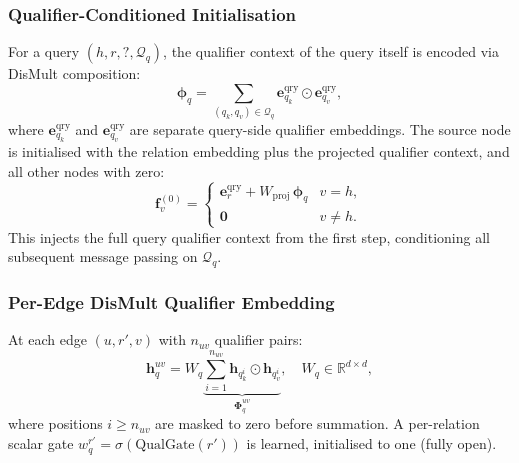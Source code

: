 \documentclass[10pt,journal,compsoc]{IEEEtran}
\begin{document}
\subsubsection{Qualifier-Conditioned Initialisation}
For a query $(h, r, ?, \mathcal{Q}_q)$,
the qualifier context of the query itself is encoded via
DisMult composition:
\begin{equation}
  \boldsymbol{\phi}_q
  = \sum_{(q_k, q_v) \in \mathcal{Q}_q}
    \mathbf{e}_{q_k}^{\mathrm{qry}}
    \odot
    \mathbf{e}_{q_v}^{\mathrm{qry}},
  \label{eq:hr_phi_query}
\end{equation}
where $\mathbf{e}_{q_k}^{\mathrm{qry}}$ and
$\mathbf{e}_{q_v}^{\mathrm{qry}}$ are separate query-side
qualifier embeddings.
The source node is initialised with the relation embedding
plus the projected qualifier context, and all other nodes
with zero:
\begin{equation}
  \mathbf{f}_v^{(0)} =
  \begin{cases}
    \mathbf{e}_r^{\mathrm{qry}}
    + W_{\mathrm{proj}}\,\boldsymbol{\phi}_q
    & v = h, \\
    \mathbf{0}
    & v \neq h.
  \end{cases}
  \label{eq:hr_init}
\end{equation}
This injects the full query qualifier context from the first
step, conditioning all subsequent message passing on
$\mathcal{Q}_q$.

\subsubsection{Per-Edge DisMult Qualifier Embedding}
At each edge $(u, r', v)$ with $n_{uv}$ qualifier pairs:
\begin{equation}
  \mathbf{h}_q^{uv}
  = W_q
    \underbrace{
      \sum_{i=1}^{n_{uv}}
      \mathbf{h}_{q_k^i} \odot \mathbf{h}_{q_v^i}
    }_{\boldsymbol{\Phi}_{q}^{uv}},
  \quad W_q \in \mathbb{R}^{d \times d},
  \label{eq:hr_hq}
\end{equation}
where positions $i \geq n_{uv}$ are masked to zero before
summation.
A per-relation scalar gate
$w_q^{r'} = \sigma\!\left(\mathrm{QualGate}(r')\right)$
is learned, initialised to one (fully open).
\end{document}
